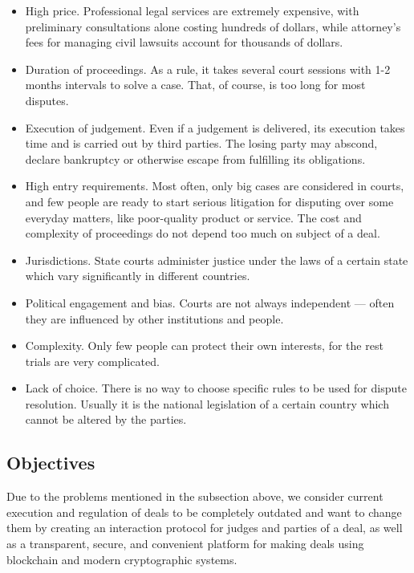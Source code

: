 \documentclass[12pt]{article}
\begin{document}
\begin{itemize}
		\item High price.  Professional legal services are extremely expensive, with preliminary consultations alone costing
				hundreds of dollars, while attorney’s fees for managing civil lawsuits account for thousands of dollars.

		\item Duration of proceedings.  As a rule, it takes several court sessions with 1-2 months intervals to solve a case. That, of course, is
				too long for most disputes.

		\item Execution of judgement.  Even if a judgement is delivered, its execution takes time and is carried out by third parties. The losing
				party may abscond, declare bankruptcy or otherwise escape from fulfilling its obligations.

		\item High entry requirements.  Most often, only big cases are considered in courts, and few people are ready to start serious litigation
				for disputing over some everyday matters, like poor-quality product or service. The cost and complexity of proceedings do not depend too
				much on subject of a deal.

		\item Jurisdictions.  State courts administer justice under the laws of a certain state which vary significantly in different countries.

		\item Political engagement and bias.  Courts are not always independent — often they are influenced by other institutions and people.

		\item Complexity.  Only few people can protect their own interests, for the rest trials are very complicated.

		\item Lack of choice.  There is no way to choose specific rules to be used for dispute resolution. Usually it is the national legislation of
				a certain country which cannot be altered by the parties. 
\end{itemize}

\subsection{Objectives} Due to the problems mentioned in the subsection above, we consider current execution and regulation of deals to be
completely outdated and want to change them by creating an interaction protocol for judges and parties of a deal, as well as a transparent,
secure, and convenient platform for making deals using blockchain and modern cryptographic systems.
\end{document}
